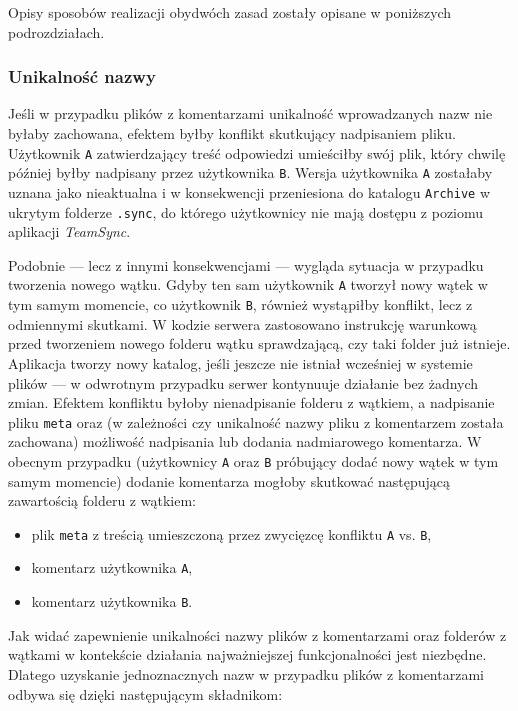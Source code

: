Opisy sposobów realizacji obydwóch zasad zostały opisane w poniższych podrozdziałach.

\subsubsection*{Unikalność nazwy}

Jeśli w przypadku plików z komentarzami unikalność wprowadzanych nazw nie byłaby zachowana, efektem byłby konflikt skutkujący nadpisaniem pliku. Użytkownik \texttt{A} zatwierdzający treść odpowiedzi umieściłby swój plik, który chwilę później byłby nadpisany przez użytkownika \texttt{B}. Wersja użytkownika \texttt{A} zostałaby uznana jako nieaktualna i w konsekwencji przeniesiona do katalogu \texttt{Archive} w ukrytym folderze \texttt{.sync}, do którego użytkownicy nie mają dostępu z poziomu aplikacji \emph{TeamSync}.

Podobnie --- lecz z innymi konsekwencjami --- wygląda sytuacja w przypadku tworzenia nowego wątku. Gdyby ten sam użytkownik \texttt{A} tworzył nowy wątek w tym samym momencie, co użytkownik \texttt{B}, również wystąpiłby konflikt, lecz z odmiennymi skutkami. W kodzie serwera zastosowano instrukcję warunkową przed tworzeniem nowego folderu wątku sprawdzającą, czy taki folder już istnieje. Aplikacja tworzy nowy katalog, jeśli jeszcze nie istniał wcześniej w systemie plików --- w odwrotnym przypadku serwer kontynuuje działanie bez żadnych zmian. Efektem konfliktu byłoby nienadpisanie folderu z wątkiem, a nadpisanie pliku \texttt{meta} oraz (w zależności czy unikalność nazwy pliku z komentarzem została zachowana) możliwość nadpisania lub dodania nadmiarowego komentarza. W obecnym przypadku (użytkownicy \texttt{A} oraz \texttt{B} próbujący dodać nowy wątek w tym samym momencie) dodanie komentarza mogłoby skutkować następującą zawartością folderu z wątkiem:

\begin{itemize}[noitemsep]
  \item plik \texttt{meta} z treścią umieszczoną przez zwycięzcę konfliktu \texttt{A} vs. \texttt{B},
  
  \item komentarz użytkownika \texttt{A},
  
  \item komentarz użytkownika \texttt{B}.
\end{itemize}

Jak widać zapewnienie unikalności nazwy plików z komentarzami oraz folderów z wątkami w kontekście działania najważniejszej funkcjonalności jest niezbędne. Dlatego uzyskanie jednoznacznych nazw w przypadku plików z komentarzami odbywa się dzięki następującym składnikom:

